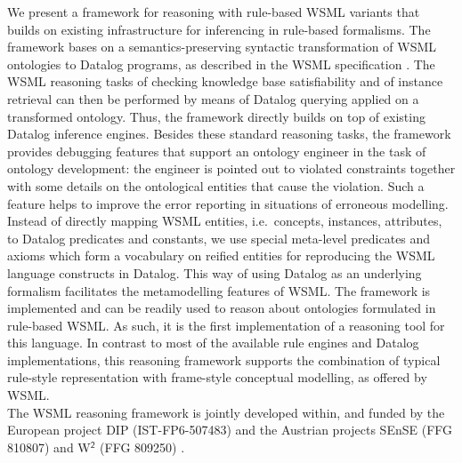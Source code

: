 We present a framework for reasoning with rule-based WSML variants
that builds on existing infrastructure for inferencing in
rule-based formalisms. The framework bases on a
semantics-preserving syntactic transformation of WSML ontologies
to Datalog programs, as described in the WSML specification
\cite{wsml-spec}. The WSML reasoning tasks of checking knowledge
base satisfiability and of instance retrieval can then be
performed by means of Datalog querying applied on a transformed
ontology. Thus, the framework directly builds on top of existing
Datalog inference engines.
%
Besides these standard reasoning tasks, the framework provides
debugging features that support an ontology engineer in the task
of ontology development: the engineer is pointed out to violated
constraints together with some details on the ontological entities
that cause the violation. Such a feature helps to improve the
error reporting in situations of erroneous modelling.
%
Instead of directly mapping WSML entities, i.e.\ concepts,
instances, attributes, to Datalog predicates and constants, we use
special meta-level predicates and axioms which form a vocabulary on
reified entities for reproducing the WSML language constructs in
Datalog. This way of using Datalog as an underlying formalism
facilitates the metamodelling features of WSML. The framework is
implemented and can be readily used to reason about ontologies
formulated in rule-based WSML. As such, it is the first
implementation of a reasoning tool for this language. In contrast to
most of the available rule engines and Datalog implementations, this
reasoning framework supports the combination of typical rule-style
representation with frame-style conceptual modelling, as offered by
WSML.\\[2mm]
The WSML reasoning framework is jointly developed within, and funded
by the European project DIP (IST-FP6-507483) and the Austrian
projects {SEnSE} (FFG 810807) and {W$^{\mathsf{2}}$} (FFG 809250)
.

